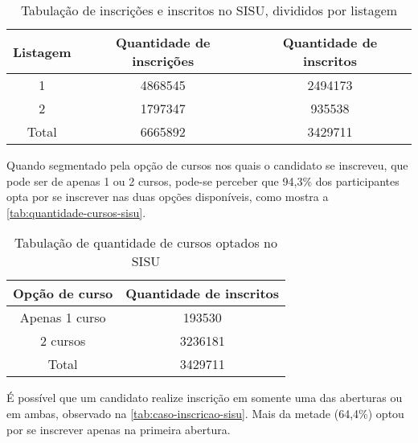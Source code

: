 \begin{table}[h]
  \begin{tabular}{ccc}
  \hline
  \multicolumn{1}{c}{\textbf{Listagem}} & \textbf{Quantidade de inscrições} & \textbf{Quantidade de inscritos} \\ \hline
  1                                     & 4868545                           & 2494173                          \\ \hline
  2                                     & 1797347                           & 935538                           \\ \hline
  Total                                 & 6665892                           & 3429711                          \\ \hline
  \end{tabular}
  \caption{Tabulação de inscrições e inscritos no SISU, divididos por listagem}
  \label{tab:inscricoes-inscritos-sisu}
  \end{table}

Quando segmentado pela opção de cursos nos quais o candidato se inscreveu, que pode ser de apenas 1 ou 2 cursos, pode-se perceber que 94,3\% dos participantes opta por se inscrever nas duas opções disponíveis, como mostra a \autoref{tab:quantidade-cursos-sisu}.

  \begin{table}[h]
    \begin{tabular}{cc}
    \hline
    \textbf{Opção de curso} & \textbf{Quantidade de inscritos} \\ \hline
    Apenas 1 curso          & 193530                           \\ \hline
    2 cursos                & 3236181                          \\ \hline
    Total                   & 3429711                          \\ \hline
    \end{tabular}
    \caption{Tabulação de quantidade de cursos optados no SISU}
    \label{tab:quantidade-cursos-sisu}
    \end{table}

\pagebreak

É possível que um candidato realize inscrição em somente uma das aberturas ou em ambas, observado na \autoref{tab:caso-inscricao-sisu}. Mais da metade (64,4\%) optou por se inscrever apenas na primeira abertura.


